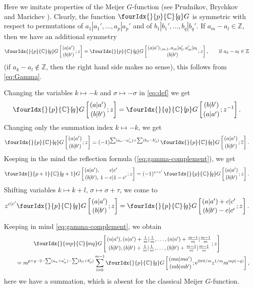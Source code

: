 \documentclass[pdftex]{sigma}
\numberwithin{equation}{section}
\newcommand{\Gc}[2]{\fourIdx{}{#1}{\C}{\!#2}G}
\def\ov{\overline}
\def\C {{\mathbb C }}
\def\Z{{\mathbb Z}}
\begin{document}
Here we imitate properties of the Meijer $G$-function
(see Prudnikov, Brychkov and Marichev \cite[Vol.~3, Section 8.2]{PBM}).
Clearly, the function
$\Gc{p}{q}$ is symmetric with respect to permutations of
$a_1|a_1',\dots,a_p|a_p'$ and of $b_1|b_1',\dots,b_q|b_q'$.
If $a_m-a_l\in \Z$, then we have an additional symmetry
\begin{equation*}
\Gc{p}{q}\left[\genfrac{}{}{0pt}{}{(a|a')}{(b|b')};z\right]
=\Gc{p}{q}\left[\genfrac{}{}{0pt}{}{(a|a')_{\setminus m,l},a_m|a_l',a_m'|a_l}
{(b|b')};z\right],\qquad\text{if $a_k-a_l\in\Z$}
\end{equation*}
(if $a_k-a_l\notin\Z$, then the right hand side makes no sense),
this follows from \eqref{eq:Gamma}.

Changing the variables $k\mapsto -k$ and $\sigma\mapsto-\sigma$
in \eqref{eq:def} we get
\begin{equation}
\Gc{p}{q}\left[\genfrac{}{}{0pt}{}{(a|a')}{(b|b')};z\right]
=\Gc{q}{p}\left[\genfrac{}{}{0pt}{}{(b|b')}{(a|a')};z^{-1}\right].
\label{eq:symmetry1}
\end{equation}
Changing only the summation index $k\mapsto -k$, we get
\[
\Gc{p}{q}\left[\genfrac{}{}{0pt}{}{(a|a')}{(b|b')};z\right]
=(-1)^{\sum(a_\alpha-a_\alpha')+\sum(b_\beta-b_\beta')} \,
\Gc{p}{q}\left[\genfrac{}{}{0pt}{}{(a|a')}{(b|b')};\ov z\right].
\]
Keeping in the mind the reflection formula (\ref{eq:gamma-complement}), we get
\begin{equation}
\Gc{p+1}{q+1}\left[\genfrac{}{}{0pt}{}{(a|a'),}{(b|b'),}
\genfrac{}{}{0pt}{}{c|c'}{1-c|1-c'};z\right]
=(-1)^{c-c'}\,
\Gc{p}{q}\left[\genfrac{}{}{0pt}{}{(a|a')}{(b|b')};z\right].
\label{eq:A-cancelation}
\end{equation}
Shifting variables $k\mapsto k+l$, $\sigma\mapsto\sigma+\tau$,
we come to
\begin{equation}
z^{c|c'}
\Gc{p}{q}\left[\genfrac{}{}{0pt}{}{(a|a')}{(b|b')};z\right]
=\Gc{p}{q}\left[\genfrac{}{}{0pt}{}{(a|a')+c|c'}{(b|b')-c|c'};z\right].
\label{eq:shift}
\end{equation}

Keeping in mind \eqref{eq:gamma-complement}, we obtain
\begin{gather}
\Gc{mp}{mq}\left[\genfrac{}{}{0pt}{}
{(a|a'),(a|a')+\frac1m|\frac1m,\dots,(a|a')+\frac{m-1}m|\frac{m-1}m}
{(b|b'),(b|b')+\frac1m|\frac{1^{\vphantom{R}}}m,\dots,(b|b')+\frac{m-1}m|\frac{m-1}m};z\right] \nonumber\\
\qquad{} =m^{p+q-2-\sum(a_\alpha+a_\alpha')-\sum(b_\beta+b_\beta')}
\sum_{l=0}^{m-1}
\Gc{p}{q}\left[\genfrac{}{}{0pt}{}{(ma|ma')}{(mb|mb')};
{\rm e}^{2\pi {\rm i} l/m} z^{1/m}m^{mp(-q)}\right],
\label{eq:A-product}
\end{gather}
here we have a summation, which is absent for the classical Meijer $G$-function.
\end{document}
